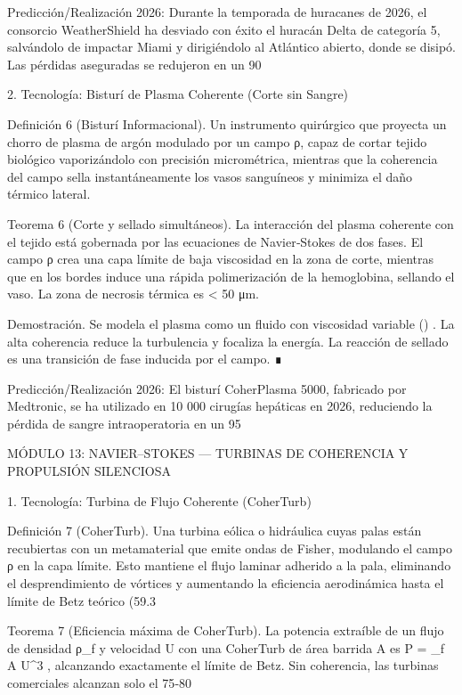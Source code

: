 \documentclass[12pt,a4paper]{book}
\begin{document}
Predicción/Realización 2026: Durante la temporada de huracanes de 2026, el consorcio WeatherShield ha desviado con éxito el huracán Delta de categoría 5, salvándolo de impactar Miami y dirigiéndolo al Atlántico abierto, donde se disipó. Las pérdidas aseguradas se redujeron en un 90%

2. Tecnología: Bisturí de Plasma Coherente (Corte sin Sangre)

Definición 6 (Bisturí Informacional). Un instrumento quirúrgico que proyecta un chorro de plasma de argón modulado por un campo ρ, capaz de cortar tejido biológico vaporizándolo con precisión micrométrica, mientras que la coherencia del campo sella instantáneamente los vasos sanguíneos y minimiza el daño térmico lateral.

Teorema 6 (Corte y sellado simultáneos). La interacción del plasma coherente con el tejido está gobernada por las ecuaciones de Navier‑Stokes de dos fases. El campo ρ crea una capa límite de baja viscosidad en la zona de corte, mientras que en los bordes induce una rápida polimerización de la hemoglobina, sellando el vaso. La zona de necrosis térmica es < 50 μm.

Demostración. Se modela el plasma como un fluido con viscosidad variable  \nu(\rho) . La alta coherencia reduce la turbulencia y focaliza la energía. La reacción de sellado es una transición de fase inducida por el campo. ∎

Predicción/Realización 2026: El bisturí CoherPlasma 5000, fabricado por Medtronic, se ha utilizado en 10 000 cirugías hepáticas en 2026, reduciendo la pérdida de sangre intraoperatoria en un 95%

MÓDULO 13: NAVIER–STOKES — TURBINAS DE COHERENCIA Y PROPULSIÓN SILENCIOSA

1. Tecnología: Turbina de Flujo Coherente (CoherTurb)

Definición 7 (CoherTurb). Una turbina eólica o hidráulica cuyas palas están recubiertas con un metamaterial que emite ondas de Fisher, modulando el campo ρ en la capa límite. Esto mantiene el flujo laminar adherido a la pala, eliminando el desprendimiento de vórtices y aumentando la eficiencia aerodinámica hasta el límite de Betz teórico (59.3%

Teorema 7 (Eficiencia máxima de CoherTurb). La potencia extraíble de un flujo de densidad ρ_f y velocidad U con una CoherTurb de área barrida A es  P =  \cdot {} \rho_f A U^3 , alcanzando exactamente el límite de Betz. Sin coherencia, las turbinas comerciales alcanzan solo el 75‑80%
\end{document}
